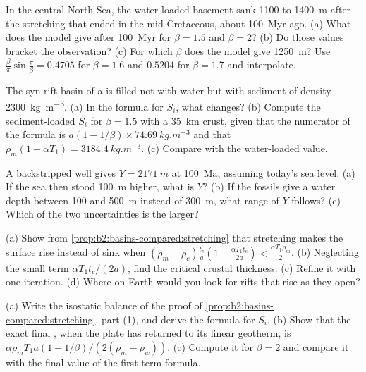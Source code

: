 \begin{exercise}[$\star\star$]\label{exo:b2:basins-compared:7}
In the central North Sea, the water-loaded basement sank 1100 to \qty{1400}{m} after the
stretching that ended in the mid-Cretaceous, about \qty{100}{Myr} ago. (a) What  does the model give after \qty{100}{Myr} for $\beta = 1.5$ and $\beta = 2$? (b) Do
those values bracket the observation? (c) For which $\beta$ does the model give \qty{1250}{m}?
Use $\frac{\beta}{\pi}\sin\frac{\pi}{\beta} = 0.4705$ for $\beta = 1.6$ and $0.5204$ for $\beta
= 1.7$ and interpolate.
\end{exercise}

\begin{exercise}[$\star\star$]\label{exo:b2:basins-compared:8}
The syn-rift basin of a  is filled not with water but with sediment of density
\qty{2300}{kg.m^{-3}}. (a) In the formula for $S_i$, what changes? (b) Compute the sediment-loaded
$S_i$ for $\beta = 1.5$ with a \qty{35}{km} crust, given that the numerator of the formula is
$a(1 - 1/\beta)\times\qty{74.69}{kg.m^{-3}}$ and that $\rho_m(1 - \alpha T_1) =
\qty{3184.4}{kg.m^{-3}}$. (c) Compare with the water-loaded value.
\end{exercise}

\begin{exercise}[$\star\star$]\label{exo:b2:basins-compared:9}
A backstripped well gives $Y = \qty{2171}{m}$ at \qty{100}{Ma}, assuming today's sea level. (a)
If the sea then stood \qty{100}{m} higher, what is $Y$? (b) If the fossils give a water depth
between 100 and \qty{500}{m} instead of \qty{300}{m}, what range of $Y$ follows? (c) Which of the
two uncertainties is the larger?
\end{exercise}

\begin{exercise}[$\star\star\star$]\label{exo:b2:basins-compared:10}
(a) Show from \cref{prop:b2:basins-compared:stretching} that stretching makes the surface rise
instead of sink when $(\rho_m - \rho_c)\frac{t_c}{a}\left(1 - \frac{\alpha T_1 t_c}{2a}\right) <
\frac{\alpha T_1\rho_m}{2}$. (b) Neglecting the small term $\alpha T_1 t_c/(2a)$, find the
critical crustal thickness. (c) Refine it with one iteration. (d) Where on Earth would you look
for rifts that rise as they open?
\end{exercise}

\begin{exercise}[$\star\star\star$]\label{exo:b2:basins-compared:11}
(a) Write the isostatic balance of the proof of \cref{prop:b2:basins-compared:stretching}, part
(1), and derive the formula for $S_i$. (b) Show that the exact final , when
the plate has returned to its linear geotherm, is $\alpha\rho_m T_1 a(1 - 1/\beta)/(2(\rho_m -
\rho_w))$. (c) Compute it for $\beta = 2$ and compare it with the final value of the
first-term formula.
\end{exercise}

